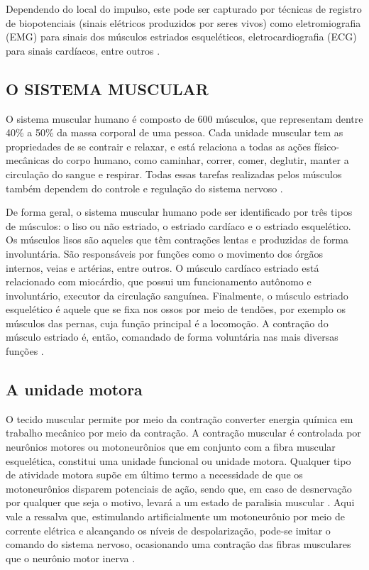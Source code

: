 Dependendo do local do impulso, este pode ser capturado por técnicas de registro de biopotenciais (sinais elétricos produzidos por seres vivos) como eletromiografia (\acrshort{EMG}) para sinais dos músculos estriados esqueléticos, eletrocardiografia (\acrshort{ECG}) para sinais cardíacos, entre outros \cite{Fonseca2015}.

\subsection{O SISTEMA MUSCULAR}

O sistema muscular humano é composto de 600 músculos, que representam dentre 40\% a 50\% da massa corporal de uma pessoa. Cada unidade muscular tem as propriedades de se contrair e relaxar, e está relaciona a todas as ações físico-mecânicas do corpo humano, como caminhar, correr, comer, deglutir, manter a circulação do sangue e respirar. Todas essas tarefas realizadas pelos músculos também dependem do controle e regulação do sistema nervoso \cite{Vanputte2016}.

De forma geral, o sistema muscular humano pode ser identificado por três tipos de músculos: o liso ou não estriado, o estriado cardíaco e o estriado esquelético. Os músculos lisos são aqueles que têm contrações lentas e produzidas de forma involuntária. São responsáveis por funções como o movimento dos órgãos internos, veias e artérias, entre outros. O músculo cardíaco estriado está relacionado com miocárdio, que possui um funcionamento autônomo e involuntário, executor da circulação sanguínea. Finalmente, o músculo estriado esquelético é aquele que se fixa nos ossos por meio de tendões, por exemplo os músculos das pernas, cuja função principal é a locomoção. A contração do músculo estriado é, então, comandado de forma voluntária nas mais diversas funções \cite{Geraldo2007}. 

\subsection*{A unidade motora}

O tecido muscular permite por meio da contração converter energia química em trabalho mecânico por meio da contração. A contração muscular é controlada por neurônios motores ou motoneurônios que em conjunto com a fibra muscular esquelética, constitui uma unidade funcional ou unidade motora. Qualquer tipo de atividade motora supõe em último termo a necessidade de que os motoneurônios disparem potenciais de ação, sendo que, em caso de desnervação por qualquer que seja o motivo, levará a um estado de paralisia muscular \cite{Jones2004}. Aqui vale a ressalva que, estimulando artificialmente um motoneurônio por meio de corrente elétrica e alcançando os níveis de despolarização, pode-se imitar o comando do sistema nervoso, ocasionando uma contração das fibras musculares que o neurônio motor inerva \cite{Lent2002}.

